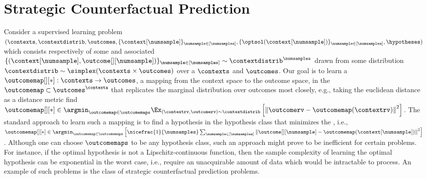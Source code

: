 \section{Strategic Counterfactual Prediction }

Consider a supervised learning problem $(\contexts, \contextdistrib, \outcomes, \{\context[\numsample]\}_{\numsample \in [\numsamples]}, \{ \optsol(\context[\numsample])\}_{\numsample \in [\numsamples]}, \hypotheses) $ which consists respectively of some  and associated  $ \{\left( \context[\numsample], \outcome[][\numsample] \right)\}_{\numsample \in [\numsamples]} \sim \contextdistrib^\numsamples$ drawn from some distribution $\contextdistrib \sim \simplex(\contexts \times \outcomes)$ over a  $\contexts$ and  $\outcomes$.   
Our goal is to learn a  $\outcomemap[][*]: \contexts \to \outcomes$, a mapping from the context space to the outcome space, in the  $\outcomemap \subset \outcomes^\contexts$ that replicates the marginal distribution over outcomes most closely, e.g., taking the euclidean distance as a distance metric find $\outcomemap[][*] \in \argmin_{\outcomemap \in \outcomemaps} \Ex_{(\contextrv, \outcomerv) \sim \contextdistrib} \left[ \left\| \outcomerv - \outcomemap(\contextrv)\right\|^2 \right]$. 
The standard approach to learn such a mapping is to find a hypothesis in the hypothesis class that minimizes the , i.e.,  $\outcomemap[][*] \in \argmin_{\outcomemap \in \outcomemaps} \left[ \nicefrac{1}{\numsamples} \sum_{\numsample \in [\numsamples]} \left\| \outcome[][\numsample] - \outcomemap (\context[\numsample]) \right\|^2 \right]$. Although one can choose $\outcomemaps$ to be any hypothesis class, such an approach might prove to be inefficient for certain problems. For instance, if the optimal hypothesis is not a Lipschitz-continuous function, then the sample complexity of learning the optimal hypothesis can be exponential in the worst case, i.e., require an unacquirable amount of data which would be intractable to process. An example of such problems is the class of strategic counterfactual prediction problems.  

